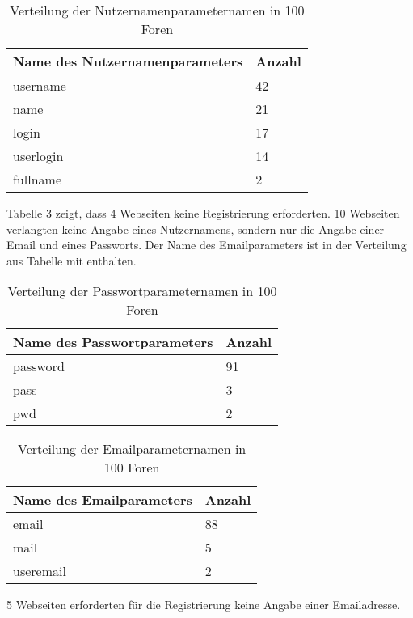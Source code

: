 
\begin{table}[h!]
\centering 
\begin{tabular}{ | p{7cm} | p{3cm}|} \hline
Name des Nutzernamenparameters & Anzahl \\ \hline
username & 42 \\ \hline
name & 21 \\ \hline
login & 17 \\ \hline
userlogin & 14 \\ \hline
fullname & 2 \\ \hline
\end{tabular}
\caption{Verteilung der Nutzernamenparameternamen in 100 Foren}
\end{table}

Tabelle 3 zeigt, dass 4 Webseiten keine Registrierung erforderten.
10 Webseiten verlangten keine Angabe eines Nutzernamens, sondern nur die Angabe einer Email und eines Passworts. Der Name des Emailparameters ist in der Verteilung aus Tabelle mit enthalten.

\begin{table}[h!]
\centering 
\begin{tabular}{ | p{7cm} | p{3cm}|} \hline
Name des Passwortparameters & Anzahl \\ \hline
password & 91 \\ \hline
pass & 3 \\ \hline
pwd & 2 \\ \hline
\end{tabular}
\caption{Verteilung der Passwortparameternamen in 100 Foren}
\end{table}

\begin{table}[h!]
\centering 
\begin{tabular}{ | p{7cm} | p{3cm}|} \hline
Name des Emailparameters & Anzahl \\ \hline
email & 88 \\ \hline
mail & 5 \\ \hline
useremail & 2 \\ \hline
\end{tabular}
\caption{Verteilung der Emailparameternamen in 100 Foren}
\end{table}

5 Webseiten erforderten für die Registrierung keine Angabe einer Emailadresse.


